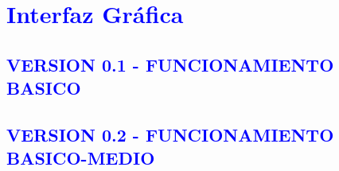 \newpage
\section{\textcolor{blue}{Interfaz Gráfica}}
\subsection{\textcolor{blue}{VERSION 0.1 - FUNCIONAMIENTO BASICO}}
\subsection{\textcolor{blue}{VERSION 0.2 - FUNCIONAMIENTO BASICO-MEDIO}}

